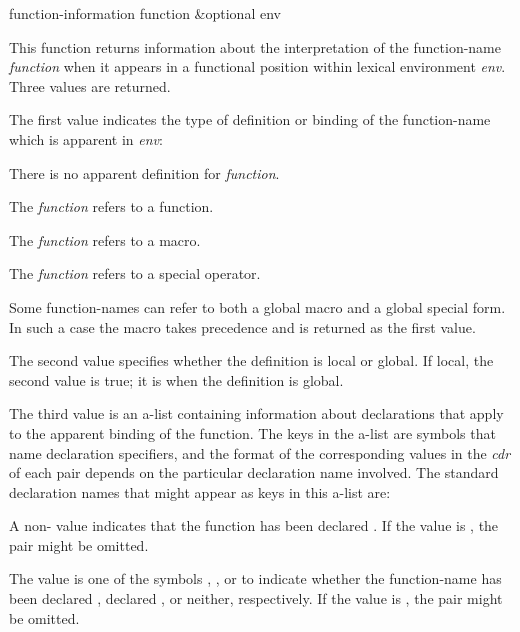 \begin{defun}[Function]
function-information function &optional env

  This function returns information about the interpretation of the function-name
  \emph{function} when it appears in a functional position within lexical 
  environment \emph{env}.  Three values are returned.

  The first value indicates the type of definition or binding of the function-name
  which is apparent in \emph{env}:
\begin{indentdesc}{7pc}
\item[\cdf{nil}] There is no apparent definition for \emph{function}.

\item[\cd{:function}] The \emph{function} refers to a function.

\item[\cd{:macro}] The \emph{function} refers to a macro.

\item[\cd{:special-form}] The \emph{function} refers to a special operator.
\end{indentdesc}
  Some function-names can refer to both a global macro and a global special
  form.  In such a case the macro takes precedence and  is returned as
  the first value.

  The second value specifies whether the definition is local or global.  If
  local, the second value is true; it is  when the definition is
  global.

  The third value is an a-list containing information about declarations
  that apply to the apparent binding of the function.  The keys in the a-list
  are symbols that name declaration specifiers, and the format of the
  corresponding values in the \emph{cdr} of each pair depends on the particular 
  declaration name involved.  The standard declaration names
  that might appear as keys in this a-list are:
\begin{indentdesc}{7pc}
\item[\cdf{dynamic-extent}]
A non- value indicates that the function has been
                declared .  If the value is , the pair
                might be omitted.

\item[\cdf{inline}]
The value is one of the symbols , , or  to indicate
                whether the function-name has been declared ,
                declared , or neither, respectively.
                If the value is , the pair might be omitted.


\end{indentdesc}
\end{defun}
